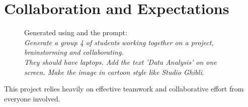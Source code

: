 \documentclass[11pt]{exam}
\begin{document}
    \newpage
    \section{Collaboration and Expectations}
    \begin{figure}
        \vspace{-12pt}
        \centering
        \caption{Generated using \href{https://gemini.google.com/}{} and the prompt:\\[4pt]
            \emph{Generate a group 4 of students working together on a project, brainstorming and collaborating.\\[4pt]
                They should have laptops. Add the text 'Data Analysis' on one screen. Make the image in cartoon style like Studio Ghibli}.}
        \vspace{-75pt}
        \label{fig:collaboration}
    \end{figure}
    This project relies heavily on effective teamwork and collaborative effort from everyone involved.
\end{document}
